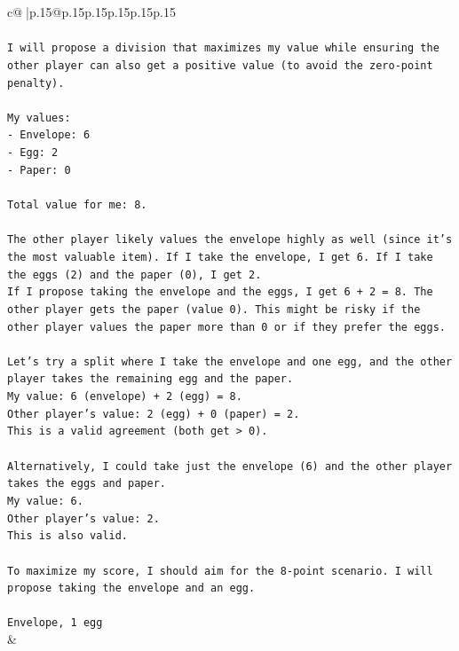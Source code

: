 \documentclass{article}
\begin{document}
{\begin{supertabular}{c@{$\;$}|p{.15\linewidth}@{}p{.15\linewidth}p{.15\linewidth}p{.15\linewidth}p{.15\linewidth}p{.15\linewidth}}
{{{\\ 
\\ 
\texttt{I will propose a division that maximizes my value while ensuring the other player can also get a positive value (to avoid the zero{-}point penalty).} \\
\\ 
\texttt{My values:} \\
\texttt{{-} Envelope: 6} \\
\texttt{{-} Egg: 2} \\
\texttt{{-} Paper: 0} \\
\\ 
\texttt{Total value for me: 8.} \\
\\ 
\texttt{The other player likely values the envelope highly as well (since it's the most valuable item). If I take the envelope, I get 6. If I take the eggs (2) and the paper (0), I get 2.} \\
\texttt{If I propose taking the envelope and the eggs, I get 6 + 2 = 8. The other player gets the paper (value 0). This might be risky if the other player values the paper more than 0 or if they prefer the eggs.} \\
\\ 
\texttt{Let's try a split where I take the envelope and one egg, and the other player takes the remaining egg and the paper.} \\
\texttt{My value: 6 (envelope) + 2 (egg) = 8.} \\
\texttt{Other player's value: 2 (egg) + 0 (paper) = 2.} \\
\texttt{This is a valid agreement (both get > 0).} \\
\\ 
\texttt{Alternatively, I could take just the envelope (6) and the other player takes the eggs and paper.} \\
\texttt{My value: 6.} \\
\texttt{Other player's value: 2.} \\
\texttt{This is also valid.} \\
\\ 
\texttt{To maximize my score, I should aim for the 8{-}point scenario. I will propose taking the envelope and an egg.} \\
\\ 
\texttt{Envelope, 1 egg} \\
            }
        }
    }
    & \\ \\


\end{supertabular}}
\end{document}
